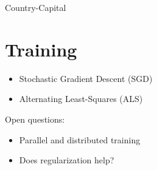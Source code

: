 \documentclass[10pt]{article}
\begin{document}
Country-Capital


\section*{Training}
\begin{itemize}
  \item Stochastic Gradient Descent (SGD)
  \item Alternating Least-Squares (ALS)
\end{itemize}

Open questions:

\begin{itemize}
  \item Parallel and distributed training
  \item Does regularization help?
\end{itemize}
\end{document}
